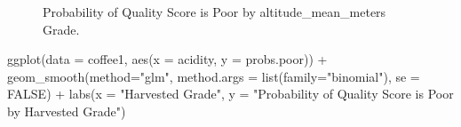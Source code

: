 \documentclass[
  letterpaper,
  DIV=11,
  numbers=noendperiod]{scrartcl}
\newenvironment{Shaded}{\begin{snugshade}}{\end{snugshade}}
\newcommand{\AttributeTok}[1]{\textcolor[rgb]{0.40,0.45,0.13}{#1}}
\newcommand{\ConstantTok}[1]{\textcolor[rgb]{0.56,0.35,0.01}{#1}}
\newcommand{\FunctionTok}[1]{\textcolor[rgb]{0.28,0.35,0.67}{#1}}
\newcommand{\NormalTok}[1]{\textcolor[rgb]{0.00,0.23,0.31}{#1}}
\newcommand{\SpecialCharTok}[1]{\textcolor[rgb]{0.37,0.37,0.37}{#1}}
\newcommand{\StringTok}[1]{\textcolor[rgb]{0.13,0.47,0.30}{#1}}
\begin{document}
\begin{figure}[H]


\caption{\label{fig-prob4}Probability of Quality Score is Poor by
altitude\_mean\_meters Grade.}

\end{figure}%

\begin{Shaded}
\begin{Highlighting}[]
\FunctionTok{ggplot}\NormalTok{(}\AttributeTok{data =}\NormalTok{ coffee1, }\FunctionTok{aes}\NormalTok{(}\AttributeTok{x =}\NormalTok{ acidity, }\AttributeTok{y =}\NormalTok{ probs.poor)) }\SpecialCharTok{+}
  \FunctionTok{geom\_smooth}\NormalTok{(}\AttributeTok{method=}\StringTok{"glm"}\NormalTok{, }
              \AttributeTok{method.args =} \FunctionTok{list}\NormalTok{(}\AttributeTok{family=}\StringTok{"binomial"}\NormalTok{), }
              \AttributeTok{se =} \ConstantTok{FALSE}\NormalTok{) }\SpecialCharTok{+}
  \FunctionTok{labs}\NormalTok{(}\AttributeTok{x =} \StringTok{"Harvested Grade"}\NormalTok{, }
       \AttributeTok{y =} \StringTok{"Probability of Quality Score is Poor by Harvested Grade"}\NormalTok{)}
\end{Highlighting}
\end{Shaded}
\end{document}
